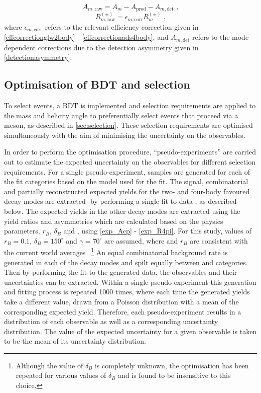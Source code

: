 \begin{equation}
A_{m, \text{raw}} = A_m - A_{\text{prod}} - A_{m, \text{det}} \text{ ,}
\end{equation}
\begin{equation}
R_{m, \text{raw}}^{(\pm)} = \epsilon_{m, \text{corr}}R_m^{(\pm)} \text{ ,}
\end{equation}
where $\epsilon_{m, \text{corr}}$ refers to the relevant efficiency correction given in \eqns\ref{effcorrectionglw2body} - \ref{effcorrectionads4body}, and $A_{m, \text{det}}$ refers to the mode-dependent corrections due to the detection asymmetry given in \tab\ref{detectionasymmetry}.

\subsection{Optimisation of BDT and \Kstar selection}
\label{sec:cpfit:optimisation}

To select \btodkst events, a BDT is implemented and selection requirements are applied to the \Kstarm mass and \KS helicity angle to preferentially select events that proceed via a \Kstarm meson, as described in \sect\ref{sec:selection}. These selection requirements are optimised simultaneously with the aim of minimising the uncertainty on the \CP observables. 

In order to perform the optimisation procedure, ``pseudo-experiments'' are carried out to estimate the expected uncertainty on the \CP observables for different selection requirements. For a single pseudo-experiment, samples are generated for each of the \CP fit categories based on the model used for the \CP fit. The signal, combinatorial and partially reconstructed expected yields for the two- and four-body favoured \Dz decay modes are extracted -by performing a single fit to data-, as described below. The expected yields in the other \Dz decay modes are extracted using the yield ratios and asymmetries which are calculated based on the physics parameters, $r_B$, $\delta_B$ and \Pgamma, using \eqns\ref{exp_Acp} - \ref{exp_R4pi}. For this study, values of $r_B = 0.1$, $\delta_B = 150^{\circ}$ and $\gamma = 70^{\circ}$ are assumed, where \Pgamma and $r_B$ are consistent with the current world averages~\cite{CKMFitter}.\footnote{Although the value of $\delta_B$ is completely unknown, the optimisation has been repeated for various values of $\delta_B$ and is found to be insensitive to this choice.}  An equal combinatorial background rate is generated in each of the \Dz decay modes and spilt equally between \Bm and \Bp categories. Then by performing the \CP fit to the generated data, the \CP observables and their uncertainties can be extracted. Within a single pseudo-experiment this generation and fitting process is repeated 1000 times, where each time the generated yields take a different value, drawn from a Poisson distribution with a mean of the corresponding expected yield. Therefore, each pseudo-experiment results in a distribution of each \CP observable as well as a corresponding uncertainty distribution. The value of the expected uncertainty for a given \CP observable is taken to be the mean of its uncertainty distribution.

